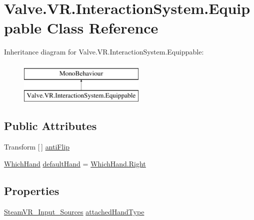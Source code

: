\hypertarget{class_valve_1_1_v_r_1_1_interaction_system_1_1_equippable}{}\section{Valve.\+V\+R.\+Interaction\+System.\+Equippable Class Reference}
\label{class_valve_1_1_v_r_1_1_interaction_system_1_1_equippable}
Inheritance diagram for Valve.\+V\+R.\+Interaction\+System.\+Equippable\+:\begin{figure}[H]
\begin{center}
\leavevmode
\includegraphics[height=2.000000cm]{class_valve_1_1_v_r_1_1_interaction_system_1_1_equippable}
\end{center}
\end{figure}
\subsection*{Public Attributes}
\begin{DoxyCompactItemize}
\item 
Transform \mbox{[}$\,$\mbox{]} \mbox{\hyperlink{class_valve_1_1_v_r_1_1_interaction_system_1_1_equippable_aeace94f2573996c91d2e4de5db17f071}{anti\+Flip}}
\item 
\mbox{\hyperlink{namespace_valve_1_1_v_r_1_1_interaction_system_a08985e7a537fc13e32e340a15d0b12af}{Which\+Hand}} \mbox{\hyperlink{class_valve_1_1_v_r_1_1_interaction_system_1_1_equippable_ae2e7fc6e2e30a5830450289d7ee5af99}{default\+Hand}} = \mbox{\hyperlink{namespace_valve_1_1_v_r_1_1_interaction_system_a08985e7a537fc13e32e340a15d0b12afa92b09c7c48c520c3c55e497875da437c}{Which\+Hand.\+Right}}
\end{DoxyCompactItemize}
\subsection*{Properties}
\begin{DoxyCompactItemize}
\item 
\mbox{\hyperlink{namespace_valve_1_1_v_r_a82e5bf501cc3aa155444ee3f0662853f}{Steam\+V\+R\+\_\+\+Input\+\_\+\+Sources}} \mbox{\hyperlink{class_valve_1_1_v_r_1_1_interaction_system_1_1_equippable_a1e270504e8965c0706f49d45c0861e12}{attached\+Hand\+Type}}
\end{DoxyCompactItemize}



